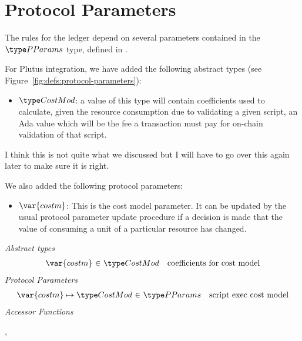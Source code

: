 \section{Protocol Parameters}
\label{sec:protocol-parameters}

The rules for the ledger depend on several parameters contained in the $\PParams$ type,
defined in \cite{byron_ledger_spec}.

For Plutus integration, we have added the following abstract types
(see Figure~\ref{fig:defs:protocol-parameters}):

\begin{itemize}
\item $\CostMod$: a value of this type will contain coefficients used to calculate,
given the resource
consumption due to validating a given script,
an Ada value which will be the fee a transaction must pay for on-chain
validation of that script.
\end{itemize}

\begin{note}
   I think this is not quite what we discussed but I will have to go over this
   again later to make sure it is right.
\end{note}

We also added the following protocol parameters:

\begin{itemize}
  \item $\var{costm}$: This is the cost model parameter. It can be updated by
  the usual protocol parameter update procedure if a decision is made that
  the value of consuming a unit of a particular resource has changed.
\end{itemize}


\begin{figure*}[htb]
  \emph{Abstract types}
  \begin{equation*}
    \begin{array}{r@{~\in~}lr}
      \var{costm} & \CostMod & \text{coefficients for cost model} \\
    \end{array}
  \end{equation*}
  \emph{Protocol Parameters}
  \begin{equation*}
      \begin{array}{r@{~\in~}lr}
        \var{costm} \mapsto \CostMod & \PParams & \text{script exec cost model}\\
      \end{array}
  \end{equation*}
  \emph{Accessor Functions}
  \begin{center}
    ,
  \end{center}
  \caption{Definitions Used in Protocol Parameters}
  \label{fig:defs:protocol-parameters}
\end{figure*}


\clearpage
